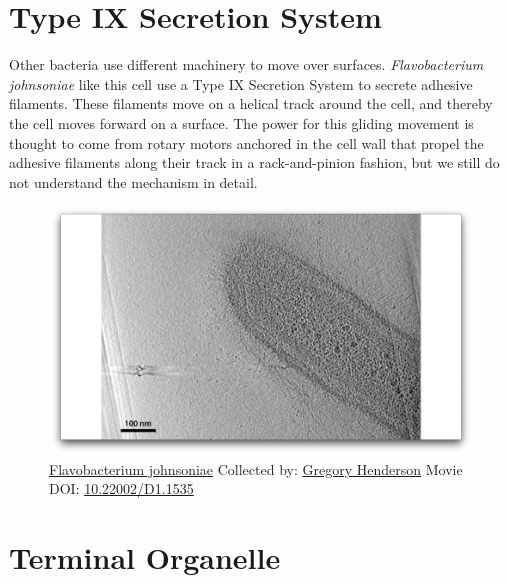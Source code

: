 \documentclass[]{tufte-book}
\begin{document}
\section{Type IX Secretion System}\label{type-ix-secretion-system}

Other bacteria use different machinery to move over surfaces.
\emph{Flavobacterium johnsoniae} like this cell use a Type IX Secretion
System to secrete adhesive filaments. These filaments move on a helical
track around the cell, and thereby the cell moves forward on a surface.
The power for this gliding movement is thought to come from rotary
motors anchored in the cell wall that propel the adhesive filaments
along their track in a rack-and-pinion fashion, but we still do not
understand the mechanism in detail.





\begin{figure}
\includegraphics{movie_stills/6_11} \caption[\protect\hyperlink{tree}{Flavobacterium johnsoniae} Collected
by: \protect\hyperlink{gregory_henderson}{Gregory Henderson} Movie DOI:
\href{https://doi.org/10.22002/D1.1535}{10.22002/D1.1535}]{\protect\hyperlink{tree}{Flavobacterium johnsoniae} Collected
by: \protect\hyperlink{gregory_henderson}{Gregory Henderson} Movie DOI:
\href{https://doi.org/10.22002/D1.1535}{10.22002/D1.1535}}\label{fig:6-11}
\end{figure}

\section{Terminal Organelle}\label{terminal-organelle}
\end{document}
